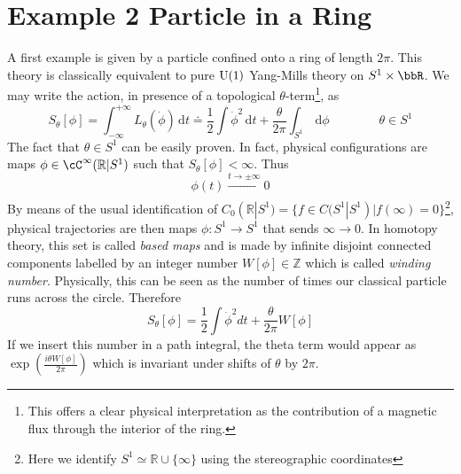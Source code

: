 \section{Example 2 Particle in a Ring}
A first example is given by a particle confined onto a ring of length $2\pi$. This theory is classically equivalent to pure $\mathrm{U}(1)$ Yang-Mills theory on $S^{1}\times\bbR$. We may write the action, in presence of a topological $\theta$-term\footnote{This offers a clear physical interpretation as the contribution of a magnetic flux through the interior of the ring.}, as
\begin{equation}
    S_\theta[\phi]= \int_{-\infty}^{+\infty} L_{\theta}(\Dot{\phi})\, \mathrm dt \doteq \frac{1}{2}\int \dot \phi^2\, \mathrm dt + \frac{\theta}{2\pi}\int_{S^1}\, \mathrm d\phi\qquad\qquad \theta\in S^1
\end{equation}
The fact that $\theta\in S^{1}$ can be easily proven. In fact, physical configurations are maps $\phi \in \cC^{\infty}(\mathbb{R}| S^1)$ such that $S_{\theta}[\phi]< \infty$. Thus
\begin{equation}
    \phi(t) \xrightarrow[]{t \to \pm \infty} 0
\end{equation}
By means of the usual identification of ${C}_0(\mathbb{R}|S^1) =\{f \in {C}(S^1| S^1) | f(\infty)=0\}$\footnote{Here we identify $S^1 \simeq \mathbb{R} \cup \{\infty\}$ using the stereographic coordinates}, physical trajectories are then maps $\phi: S^1 \to S^1$ that sends $\infty \to 0$. In homotopy theory, this set is called \textit{based maps} and is made by infinite disjoint connected components labelled by an integer number $ W[\phi] \in \mathbb{Z}$ which is called \textit{winding number}. Physically, this can be seen as the number of times our classical particle runs across the circle. Therefore
\begin{equation}
    S_{\theta}[\phi] = \frac{1}{2} \int \Dot{\phi}^2 dt + \frac{\theta}{2 \pi} W[\phi]
\end{equation}
If we insert this number in a path integral, the theta term would appear as $\exp(\frac{i \theta W[\phi]}{2\pi})$ which is invariant under shifts of $\theta$ by $2 \pi$.


